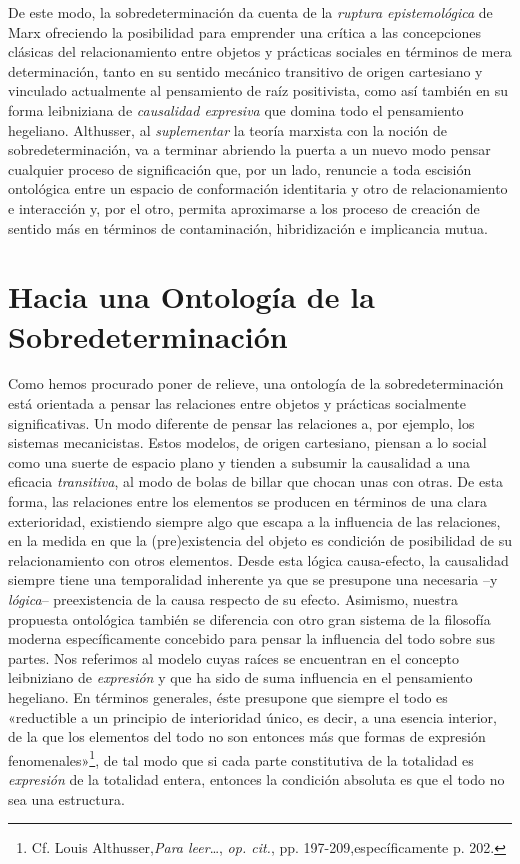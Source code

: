De este modo, la sobredeterminación da cuenta de la \emph{ruptura epistemológica} de Marx ofreciendo la posibilidad para emprender una crítica a las concepciones clásicas del relacionamiento entre objetos y prácticas sociales en términos de mera determinación, tanto en su sentido mecánico transitivo de origen cartesiano y vinculado actualmente al pensamiento de raíz positivista, como así también en su forma leibniziana de \emph{causalidad expresiva} que domina todo el pensamiento hegeliano. Althusser, al \emph{suplementar} la teoría marxista con la noción de sobredeterminación, va a terminar abriendo la puerta a un nuevo modo pensar cualquier proceso de significación que, por un lado, renuncie a toda escisión ontológica entre un espacio de conformación identitaria y otro de relacionamiento e interacción y, por el otro, permita aproximarse a los proceso de creación de sentido más en términos de contaminación, hibridización e implicancia mutua.

\section{Hacia una Ontología de la Sobredeterminación}

Como hemos procurado poner de relieve, una ontología de la sobredeterminación está orientada a pensar las relaciones entre objetos y prácticas socialmente significativas. Un modo diferente de pensar las relaciones a, por ejemplo, los sistemas mecanicistas. Estos modelos, de origen cartesiano, piensan a lo social como una suerte de espacio plano y tienden a subsumir la causalidad a una eficacia \emph{transitiva}, al modo de bolas de billar que chocan unas con otras. De esta forma, las relaciones entre los elementos se producen en términos de una clara exterioridad, existiendo siempre algo que escapa a la influencia de las relaciones, en la medida en que la (pre)existencia del objeto es condición de posibilidad de su relacionamiento con otros elementos. Desde esta lógica causa-efecto, la causalidad siempre tiene una temporalidad inherente ya que se presupone una necesaria --y \emph{lógica}-- preexistencia de la causa respecto de su efecto. Asimismo, nuestra propuesta ontológica también se diferencia con otro gran sistema de la filosofía moderna específicamente concebido para pensar la influencia del todo sobre sus partes. Nos referimos al modelo cuyas raíces se encuentran en el concepto leibniziano de \emph{expresión} y que ha sido de suma influencia en el pensamiento hegeliano. En términos generales, éste presupone que siempre el todo es «reductible a un principio de interioridad único, es decir, a una esencia interior, de la que los elementos del todo no son entonces más que formas de expresión fenomenales»\footnote{Cf. Louis Althusser,\emph{Para leer}\ldots, \emph{op. cit.}, pp. 197-209,específicamente p. 202.}, de tal modo que si cada parte constitutiva de la totalidad es \emph{expresión} de la totalidad entera, entonces la condición absoluta es que el todo no sea una estructura.


